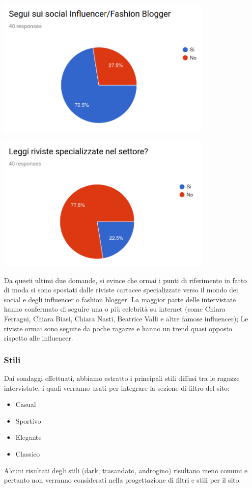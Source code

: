 \documentclass[12pt,a4paper]{report}
\begin{document}
\begin{flushleft}
  \includegraphics[width=0.8\textwidth]{"Images Latex/Grafici Sondaggi/10 - Segui Influencer"}
\end{flushleft}
\begin{flushleft}
  \includegraphics[width=0.8\textwidth]{"Images Latex/Grafici Sondaggi/11 - Segui riviste"}
\end{flushleft}
Da questi ultimi due domande, si evince che ormai i punti di riferimento in fatto di moda si sono spostati dalle riviste cartacee specializzate verso il mondo dei social e degli influencer o fashion blogger. La maggior parte delle intervistate hanno confermato di seguire una o più celebrità su internet (come Chiara Ferragni, Chiara Biasi, Chiara Nasti, Beatrice Valli e altre famose influencer); Le riviste ormai sono seguite da poche ragazze e hanno un trend quasi opposto rispetto alle influencer.\\
\subsubsection{Stili}
Dai sondaggi effettuati, abbiamo estratto i principali stili diffusi tra le ragazze intervistate, i quali verranno usati per integrare la sezione di filtro del sito:
\begin{itemize}
  \item Casual
  \item Sportivo
  \item Elegante
  \item Classico
\end{itemize}
Alcuni risultati degli stili (dark, trasandato, androgino) risultano meno comuni e pertanto non verranno considerati nella progettazione di filtri e stili per il sito.
\end{document}
